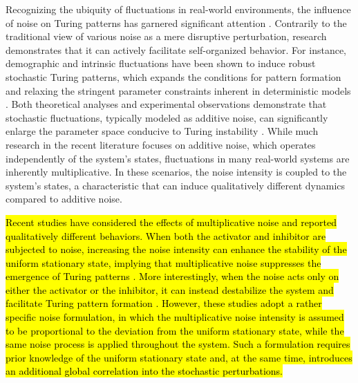 \documentclass{SCIS2026}
\newcommand{\hlb}[1]{\sethlcolor{b}\hl{#1}}
\begin{document}
Recognizing the ubiquity of fluctuations in real-world environments, the influence of noise on Turing patterns has garnered significant attention \cite{Asllani2013,Biancalani2017,Francesca2023,Avitanile2026}.
Contrarily to the traditional view of various noise as a mere disruptive perturbation, research demonstrates that it can actively facilitate self-organized behavior.
For instance, demographic and intrinsic fluctuations have been shown to induce robust stochastic Turing patterns, which expands the conditions for pattern formation and relaxing the stringent parameter constraints inherent in deterministic models \cite{Butler2009,Butler2011}.
Both theoretical analyses and experimental observations demonstrate that stochastic fluctuations, typically modeled as additive noise, can significantly enlarge the parameter space conducive to Turing instability \cite{Biancalani2010,Karig2018}.
While much research in the recent literature focuses on additive noise, which operates independently of the system's states, fluctuations in many real-world systems are inherently multiplicative.
In these scenarios, the noise intensity is coupled to the system's states, a characteristic that can induce qualitatively different dynamics compared to additive noise.

\hlb{Recent studies have considered the effects of multiplicative noise and reported qualitatively different behaviors.
When both the activator and inhibitor are subjected to noise, increasing the noise intensity can enhance the stability of the uniform stationary state, implying that multiplicative noise suppresses the emergence of Turing patterns \cite{Xiao2023,Khan2025}.
More interestingly, when the noise acts only on either the activator or the inhibitor, it can instead destabilize the system and facilitate Turing pattern formation \cite{Khan2025}.
However, these studies adopt a rather specific noise formulation, in which the multiplicative noise intensity is assumed to be proportional to the deviation from the uniform stationary state, while the same noise process is applied throughout the system.
Such a formulation requires prior knowledge of the uniform stationary state and, at the same time, introduces an additional global correlation into the stochastic perturbations.}
\end{document}

